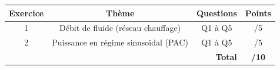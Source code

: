\documentclass[a4paper,11pt]{article}
\begin{document}
\begin{reponsebox}[4cm]
\dotfill

\dotfill

\dotfill

\dotfill

\dotfill
\end{reponsebox}

\vfill

\begin{center}
\begin{tabular}{|c|c|c|c|}
\hline
\textbf{Exercice} & \textbf{Thème} & \textbf{Questions} & \textbf{Points} \\
\hline
1 & Débit de fluide (réseau chauffage) & Q1 à Q5 & /5 \\
\hline
2 & Puissance en régime sinusoïdal (PAC) & Q1 à Q5 & /5 \\
\hline
\multicolumn{3}{|r|}{\textbf{Total}} & \textbf{/10} \\
\hline
\end{tabular}
\end{center}
\end{document}
